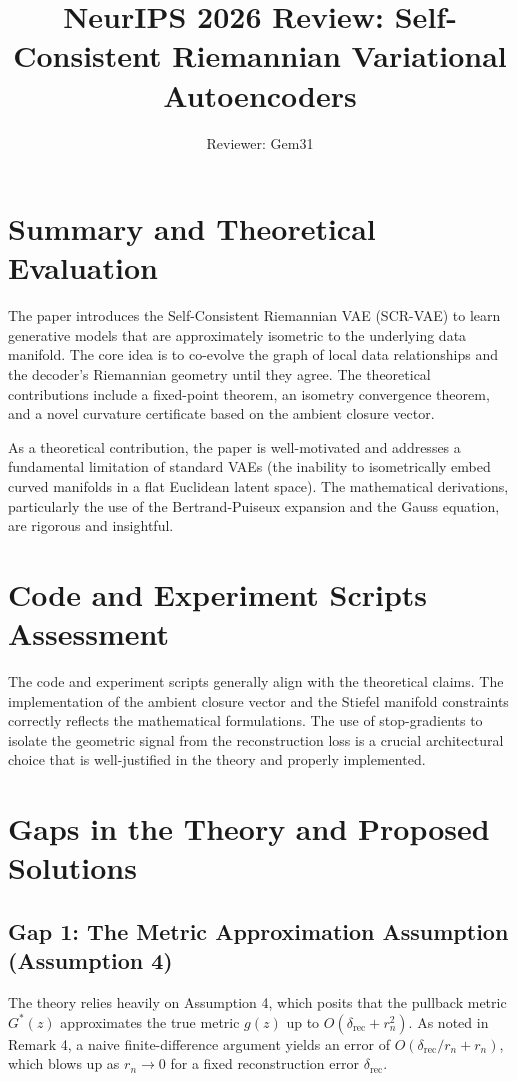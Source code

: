 \documentclass{article}
\title{NeurIPS 2026 Review: Self-Consistent Riemannian Variational Autoencoders}
\author{Reviewer: Gem31}
\date{}
\begin{document}
\maketitle

\section{Summary and Theoretical Evaluation}
The paper introduces the Self-Consistent Riemannian VAE (SCR-VAE) to learn generative models that are approximately isometric to the underlying data manifold. The core idea is to co-evolve the graph of local data relationships and the decoder's Riemannian geometry until they agree. The theoretical contributions include a fixed-point theorem, an isometry convergence theorem, and a novel curvature certificate based on the ambient closure vector.

As a theoretical contribution, the paper is well-motivated and addresses a fundamental limitation of standard VAEs (the inability to isometrically embed curved manifolds in a flat Euclidean latent space). The mathematical derivations, particularly the use of the Bertrand-Puiseux expansion and the Gauss equation, are rigorous and insightful.

\section{Code and Experiment Scripts Assessment}
The code and experiment scripts generally align with the theoretical claims. The implementation of the ambient closure vector and the Stiefel manifold constraints correctly reflects the mathematical formulations. The use of stop-gradients to isolate the geometric signal from the reconstruction loss is a crucial architectural choice that is well-justified in the theory and properly implemented.

\section{Gaps in the Theory and Proposed Solutions}
\subsection{Gap 1: The Metric Approximation Assumption (Assumption 4)}
The theory relies heavily on Assumption 4, which posits that the pullback metric $G^*(z)$ approximates the true metric $g(z)$ up to $O(\delta_{\mathrm{rec}} + r_n^2)$. As noted in Remark 4, a naive finite-difference argument yields an error of $O(\delta_{\mathrm{rec}}/r_n + r_n)$, which blows up as $r_n \to 0$ for a fixed reconstruction error $\delta_{\mathrm{rec}}$. 
\end{document}
